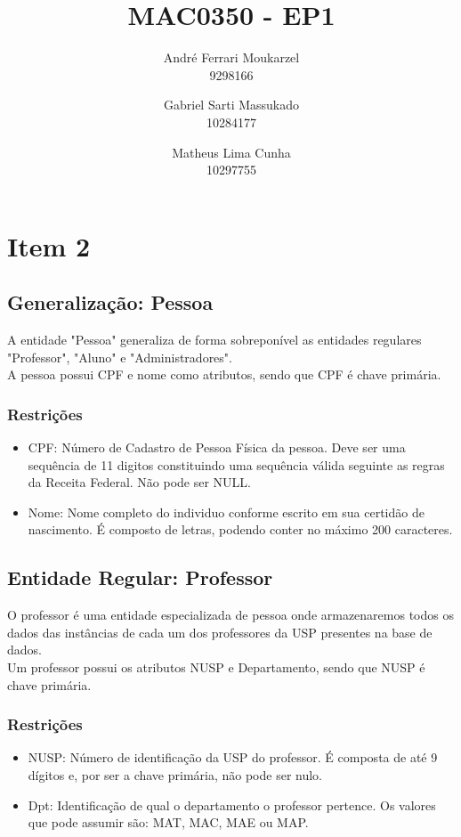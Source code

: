 \documentclass{article}
\title{MAC0350 - EP1}
\date{}
\author{
	André Ferrari Moukarzel \\ 9298166
	\and 
	Gabriel Sarti Massukado \\ 10284177
	\and
	Matheus Lima Cunha \\ 10297755
}
\begin{document}
  \maketitle
  \newpage
  
  \section{Item 2}
    \subsection{Generalização: Pessoa}
        \quad A entidade "Pessoa" generaliza de forma sobreponível as entidades regulares "Professor", "Aluno" e "Administradores". \\
        \quad A pessoa possui CPF e nome como atributos, sendo que CPF é chave primária.
        \subsubsection{Restrições}
            \begin{itemize}
                \item CPF: Número de Cadastro de Pessoa Física da pessoa. Deve ser uma sequência de 11 digitos constituindo uma sequência válida seguinte as regras da Receita Federal. Não pode ser NULL.
                \item Nome: Nome completo do individuo conforme escrito em sua certidão de nascimento. É composto de letras, podendo conter no máximo 200 caracteres. 
            \end{itemize}
            
  	\subsection{Entidade Regular: Professor}
  		\quad O professor é uma entidade especializada de pessoa onde armazenaremos todos os dados das instâncias de cada um dos professores da USP presentes na base de dados. \\
  		\quad Um professor possui os atributos NUSP e Departamento, sendo que NUSP é chave primária.  
  		\subsubsection{Restrições}
  		    \begin{itemize}
  		        \item NUSP: Número de identificação da USP do professor. É composta de até 9 dígitos e, por ser a chave primária, não pode ser nulo. 
  		        \item Dpt: Identificação de qual o departamento o professor pertence. Os valores que pode assumir são: MAT, MAC, MAE ou MAP.
  		    \end{itemize}
  		    
\end{document}
